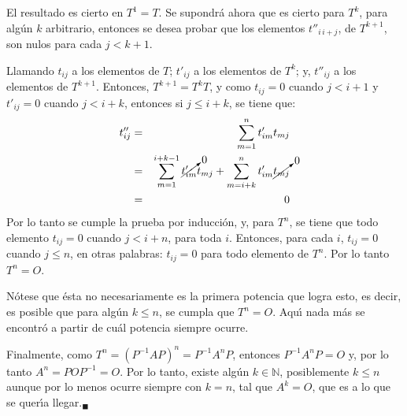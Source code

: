 \begin{solucion}
 \par 
 El resultado es cierto en $T^1 = T$. Se supondr\'a ahora que es cierto  para $T^k$, para alg\'un $k$ arbitrario, entonces se desea probar que los elementos $t''_{i\,i+j}$, de $T^{k+1}$, son nulos para cada $j<k+1$.
 \par
 Llamando $t_{ij}$ a los elementos de $T$; $t'_{ij}$ a los elementos de $T^k$; y, $t''_{ij}$ a los elementos de $T^{k+1}$.
 Entonces, $T^{k+1}=T^kT$, y como $t_{ij}=0$ cuando $j<i+1$ y $t'_{ij}=0$ cuando $j<i+k$, entonces si $j\leq i+k$, se tiene que:
 \begin{eqnarray*}
  t''_{ij} & = & \sum_{m=1}^n t'_{im}t_{mj} \\ 
  & = & \sum_{m=1}^{i+k-1} \cancelto{0}{t'_{im}} t_{mj}  + \sum_{m=i+k}^n t'_{im}\cancelto{0}{t_{mj}} \\
  & = & 0
 \end{eqnarray*}
 Por lo tanto se cumple la prueba por inducci\'on, y, para $T^n$, se tiene que todo elemento $t_{ij} = 0$ cuando $j<i+n$, para toda $i$. Entonces, para cada $i$, $t_{ij} = 0$ cuando $j\leq n$, en otras palabras: $t_{ij} = 0$ para todo elemento de $T^n$.
 Por lo tanto $T^n = O$.
 \par 
 N\'otese que \'esta no necesariamente es la primera potencia que logra esto, es decir, es posible que para alg\'un $k\leq n$, se cumpla que $T^n = O$. Aqu\'{\i} nada m\'as se encontr\'o a partir de cu\'al potencia siempre ocurre.
 \par 
 Finalmente, como $T^n = \left( P^{-1}AP \right)^{n} = P^{-1}A^nP$, entonces $P^{-1}A^n P = O$ y, por lo tanto $A^n = POP^{-1} = O$. Por lo tanto, existe alg\'un $k\in\mathbb{N}$, posiblemente $k\leq n$ aunque por lo menos ocurre siempre con $k=n$, tal que $A^k = O$, que es a lo que se quer\'{\i}a llegar.${}_{\blacksquare}$
\end{solucion}
